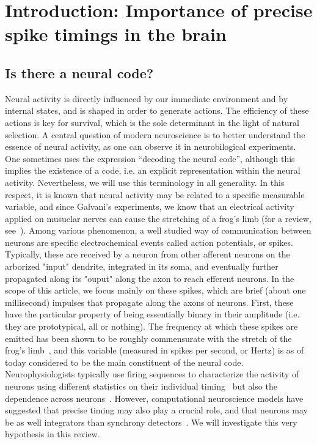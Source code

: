 \documentclass[brainsci, %
               review,submit,pdftex,moreauthors%
               ]{Definitions/mdpi}
\begin{document}
%
\section{Introduction: Importance of precise spike timings in the brain}\label{sec:time}
%
\subsection{Is there a neural code?}
%
 Neural activity is directly influenced by our immediate environment and by internal states, and is shaped in order to generate actions. The efficiency of these actions is key for survival, which is the sole determinant in the light of natural selection. A central question of modern neuroscience is to better understand the essence of neural activity, as one can observe it in neurobilogical experiments. One sometimes uses the expression ``decoding the neural code'', although this implies the existence of a code, i.e. an explicit representation within the neural activity. Nevertheless, we will use this terminology in all generality. In this respect, it is known that neural activity may be related to a specific measurable variable, and since Galvani's experiments, we know that an electrical activity applied on musuclar nerves can cause the stretching of a frog's limb (for a review, see~\citep{piccolino_luigi_1997}). Among various phenomenon, a well studied way of communication between neurons are specific electrochemical events called action potentials, or spikes. Typically, these are received by a neuron from other afferent neurons on the arborized "input" dendrite, integrated in its soma, and eventually further propagated along its "ouput" along the axon to reach efferent neurons. In the scope of this article, we focus mainly on these spikes, which are brief (about one millisecond) impulses that propagate along the axons of neurons. First, these have the particular property of being essentially binary in their amplitude (i.e. they are prototypical, all or nothing). The frequency at which these spikes are emitted has been shown to be roughly commensurate with the stretch of the frog's limb~\citep{adrian_impulses_1926}, and this variable (measured in spikes per second, or Hertz) is as of today considered to be the main constituent of the neural code. Neurophysiologists typically use firing sequences to characterize the activity of neurons using different statistics on their individual timing~\citep{perkel_neuronal_1967} but also the dependence across neurons~\citep{perkel_neuronal_1967-1}.  However, computational neuroscience models have suggested that precise timing may also play a crucial role, and that neurons may be as well integrators than synchrony detectors~\citep{paugam-moisy_computing_2012}. We will investigate this very hypothesis in this review.
\end{document}
